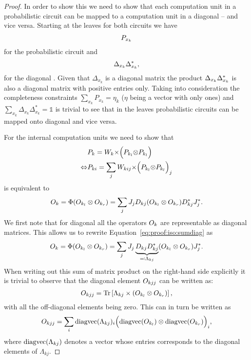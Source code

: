 \begin{proof}
	In order to show this we need to show that each computation unit in a probabilistic circuit can be mapped to a computation unit in a diagonal \punc -- and vice versa. Starting at the leaves for both circuits we have
	\begin{align}
		P_{x_k}
	\end{align}
	for the probabilistic circuit and
	\begin{align}
		\Delta_{x_k}  \Delta_{x_k}^*,
	\end{align}
	for the diagonal \punc. Given that $\Delta_{x_k}$ is a diagonal matrix the product $\Delta_{x_k}  \Delta_{x_k}^*$ is also a diagonal matrix with positive entries only. Taking into consideration the completeness constraints $\sum_{x_k} P_{x_k} = \eta_k $ ($\eta$ being a vector with only ones) and $\sum_{x_k} \Delta_{x_k} \Delta_{x_k}^* = \mathbb{1} $ is trivial to see that in the leaves probabilistic circuits can be mapped onto diagonal \puncs and vice versa.

	For the internal computation units we need to show that
	\begin{align}
		\phantom{\Leftrightarrow} &
		P_k
		=
		W_k {\times} \Bigl(P_{k_l} {\otimes} P_{k_l}\Bigr)
		\\
		\Leftrightarrow           &
		P_{ki}
		=
		\sum_j W_{kij} {\times} \Bigl(P_{k_l} {\otimes} P_{k_l}\Bigr)_j
		\label{eq:proof:iso:vecunit}
	\end{align}
	is equivalent to
	\begin{align}
		O_k = \Phi (O_{k_l} \otimes O_{k_r})
		=
		\sum_j J_j D_{kj} (O_{k_l} \otimes O_{k_r}) D^*_{kj} J_j^*.
		\label{eq:proof:iso:sumdiag}
	\end{align}
	We first note that for diagonal \puncs all the operators $O_k$ are representable as diagonal matrices. This allows us to rewrite Equation~\ref{eq:proof:iso:sumdiag} as
	\begin{align}
		O_k = \Phi (O_{k_l} \otimes O_{k_r})
		=
		\sum_j  J_j  \underbrace{ D_{kj} D^*_{kj}}_{\eqqcolon \Lambda_{kj}} (O_{k_l} \otimes O_{k_r})  J_j^*.
	\end{align}
	When writing out this sum of matrix product on the right-hand side explicitly it is trivial to observe that the diagonal element $O_{kjj}$ can be written as:
	\begin{align}
		O_{kjj}
		=
		\Tr \left[  \Lambda_{kj} \times (O_{k_l} \otimes O_{k_r}) \right],
	\end{align}
	with all the off-diagonal elements being zero. This can in turn be written as
	\begin{align}
		O_{kjj}
		=
		\sum_i  \text{diagvec} ( \Lambda_{kj} )_i  \Bigl( \text{diagvec} (O_{k_l}) \otimes \text{diagvec} (O_{k_r}) \Bigr)_i,
	\end{align}
	where $\text{diagvec} (\Lambda_{kj})$ denotes a vector whose entries corresponds to the diagonal elements of $\Lambda_{kj}$.


\end{proof}

